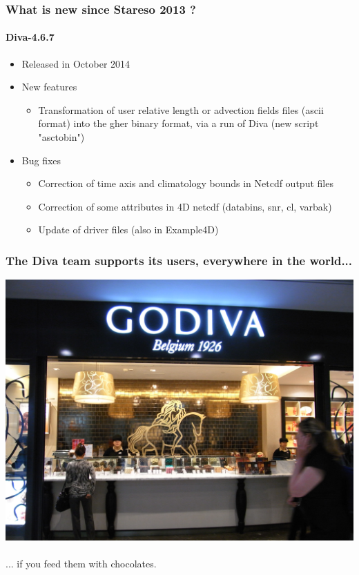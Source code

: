 \begin{frame}
  \frametitle{What is new since Stareso 2013 ?}
  \framesubtitle{Diva-4.6.7}
  \begin{itemize}
   \item Released in October 2014
   \item New features
   \begin{itemize}
   \item Transformation of user relative length or advection fields files (ascii format) into the gher binary format, via a run of Diva (new script "asctobin") 
   \end{itemize}
   \item Bug fixes
   \begin{itemize}
   \item Correction of time axis and climatology bounds in Netcdf output files %
   \item Correction of some attributes in 4D netcdf (databins, snr, cl, varbak) %
   \item Update of driver files (also in Example4D)   
   \end{itemize}
   \end{itemize}
\end{frame}
\begin{frame}
  \frametitle{The Diva team supports its users, everywhere in the world...}
  \pause
  \includegraphics[scale=0.07]{./figures/HK_Central_IFC_Mall_lunch_time_shop_GODIVA_Belgium_1926_sign_April-2012.JPG}
  ~\\
   ... if you feed them with chocolates.
\end{frame}


